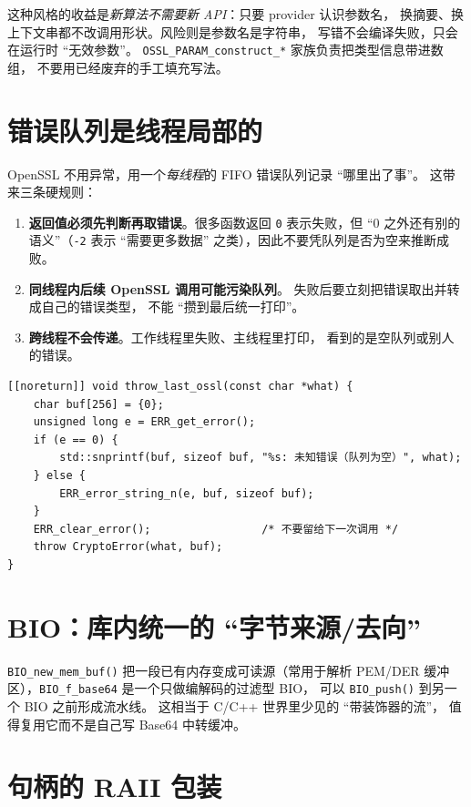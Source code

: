 \documentclass[12pt,a4paper,fontset=fandol]{ctexbook}
\newcommand{\Fn}[1]{\texttt{#1()}}
\newcommand{\Tp}[1]{\texttt{#1}}
\newcommand{\CppJava}{C/C++}
\begin{document}
这种风格的收益是\emph{新算法不需要新 API}：只要 provider 认识参数名，
换摘要、换上下文串都不改调用形状。风险则是参数名是字符串，
写错不会编译失败，只会在运行时 ``无效参数''。
\Tp{OSSL\_PARAM\_construct\_*} 家族负责把类型信息带进数组，
不要用已经废弃的手工填充写法。

\section{错误队列是线程局部的}

OpenSSL 不用异常，用一个\emph{每线程}的 FIFO 错误队列记录 ``哪里出了事''。
这带来三条硬规则：

\begin{enumerate}
  \item \textbf{返回值必须先判断再取错误}。很多函数返回 \texttt{0}
        表示失败，但 ``0 之外还有别的语义''（\texttt{-2} 表示
        ``需要更多数据'' 之类），因此不要凭队列是否为空来推断成败。
  \item \textbf{同线程内后续 OpenSSL 调用可能污染队列}。
        失败后要立刻把错误取出并转成自己的错误类型，
        不能 ``攒到最后统一打印''。
  \item \textbf{跨线程不会传递}。工作线程里失败、主线程里打印，
        看到的是空队列或别人的错误。
\end{enumerate}

\begin{lstlisting}[caption={把 OpenSSL 错误队列转成自己的异常}]
[[noreturn]] void throw_last_ossl(const char *what) {
    char buf[256] = {0};
    unsigned long e = ERR_get_error();
    if (e == 0) {
        std::snprintf(buf, sizeof buf, "%s: 未知错误（队列为空）", what);
    } else {
        ERR_error_string_n(e, buf, sizeof buf);
    }
    ERR_clear_error();                 /* 不要留给下一次调用 */
    throw CryptoError(what, buf);
}
\end{lstlisting}

\section{BIO：库内统一的 ``字节来源/去向''}

\Fn{BIO\_new\_mem\_buf} 把一段已有内存变成可读源（常用于解析
PEM/DER 缓冲区），\Tp{BIO\_f\_base64} 是一个只做编解码的过滤型 BIO，
可以 \Fn{BIO\_push} 到另一个 BIO 之前形成流水线。
这相当于 \CppJava{} 世界里少见的 ``带装饰器的流''，
值得复用它而不是自己写 Base64 中转缓冲。

\section{句柄的 RAII 包装}
\end{document}
